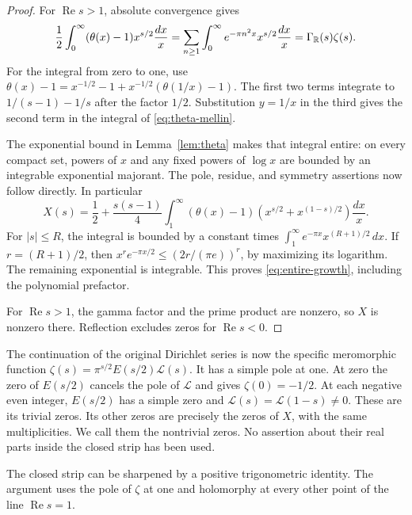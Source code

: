 \begin{proof}
For $\operatorname{Re}s>1$, absolute convergence gives
\[
 \frac12\int_0^\infty(\theta(x)-1)x^{s/2}\frac{dx}{x}
 =\sum_{n\geq1}\int_0^\infty e^{-\pi n^2x}x^{s/2}\frac{dx}{x}
 =\Gamma_{\mathbb R}(s)\zeta(s).
\]
For the integral from zero to one, use
$\theta(x)-1=x^{-1/2}-1+x^{-1/2}(\theta(1/x)-1)$.
The first two terms integrate to $1/(s-1)-1/s$ after the factor $1/2$.
Substitution $y=1/x$ in the third gives the second term in the integral
of \eqref{eq:theta-mellin}.

The exponential bound in Lemma~\ref{lem:theta} makes that integral entire:
on every compact set, powers of $x$ and any fixed powers of $\log x$ are
bounded by an integrable exponential majorant.
The pole, residue, and symmetry assertions now follow directly.
In particular
\[
 X(s)=\frac12+\frac{s(s-1)}4
       \int_1^\infty(\theta(x)-1)
             \left(x^{s/2}+x^{(1-s)/2}\right)\frac{dx}{x}.
\]
For $|s|\leq R$, the integral is bounded by a constant times
$\int_1^\infty e^{-\pi x}x^{(R+1)/2}\,dx$.
If $r=(R+1)/2$, then
$x^r e^{-\pi x/2}\leq(2r/(\pi e))^r$, by maximizing its logarithm.
The remaining exponential is integrable.  This proves
\eqref{eq:entire-growth}, including the polynomial prefactor.

For $\operatorname{Re}s>1$, the gamma factor and the prime product are
nonzero, so $X$ is nonzero there.  Reflection excludes zeros for
$\operatorname{Re}s<0$.
\end{proof}

The continuation of the original Dirichlet series is now the specific
meromorphic function $\zeta(s)=\pi^{s/2}E(s/2)\mathcal L(s)$.
It has a simple pole at one.  At zero the zero of $E(s/2)$ cancels the
pole of $\mathcal L$ and gives $\zeta(0)=-1/2$.
At each negative even integer, $E(s/2)$ has a simple zero and
$\mathcal L(s)=\mathcal L(1-s)\ne0$.
These are its trivial zeros.  Its other zeros are precisely the zeros of
$X$, with the same multiplicities.  We call them the nontrivial zeros.
No assertion about their real parts inside the closed strip has been used.

The closed strip can be sharpened by a positive trigonometric identity.
The argument uses the pole of $\zeta$ at one and holomorphy at every
other point of the line $\operatorname{Re}s=1$.

